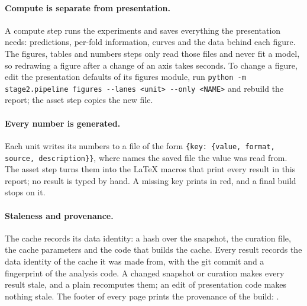 \paragraph{Compute is separate from presentation.} A compute step runs the experiments and saves everything the
presentation needs: predictions, per-fold information, curves and the data behind each figure. The figures,
tables and numbers steps only read those files and never fit a model, so redrawing a figure after a change of
an axis takes seconds. To change a figure, edit the presentation defaults of its figures module, run
\texttt{python -m stage2.pipeline figures -{}-lanes <unit> -{}-only <NAME>} and rebuild the report; the asset step
copies the new file.

\paragraph{Every number is generated.} Each unit writes its numbers to a file of the form
\texttt{\{key: \{value, format, source, description\}\}}, where  names the saved file the value was
read from. The asset step turns them into the \LaTeX{} macros that print every result in this report; no result
is typed by hand. A missing key prints in red, and a final build stops on it.

\paragraph{Staleness and provenance.} The cache records its data identity: a hash over the snapshot, the
curation file, the cache parameters and the code that builds the cache. Every result records the data identity
of the cache it was made from, with the git commit and a fingerprint of the analysis code. A changed snapshot or
curation makes every result stale, and a plain  recomputes them; an edit of presentation code makes
nothing stale. The footer of every page prints the provenance of the build: \provenanceline.

